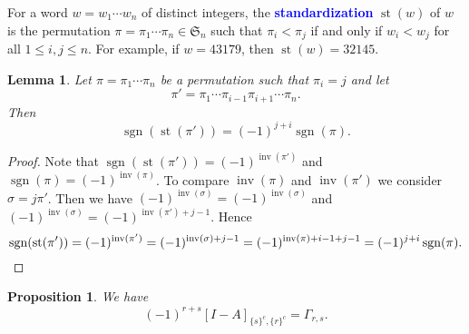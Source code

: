 \documentclass[oneside]{book}
\numberwithin{equation}{section}
\newtheorem{lem}[thm]{Lemma}
\newtheorem{prop}[thm]{Proposition}
\theoremstyle{definition}
\newcommand\st{\operatorname{st}}
\newcommand\inv{\operatorname{inv}}
\newcommand\sgn{\operatorname{sgn}}
\newcommand\sym{\mathfrak{S}}
\renewcommand\emph[1]{\textcolor{blue}{\bf #1}}
\begin{document}
For a word \( w = w_1 \cdots w_n \) of distinct integers, the
\emph{standardization} \( \st(w) \) of \( w \) is the permutation
\( \pi = \pi_1 \cdots \pi_n\in \sym_n \) such that \( \pi_i<\pi_j \)
if and only if \( w_i<w_j \) for all \( 1\le i,j\le n \).
For example, if \( w = 43179 \), then \( \st(w) = 32145 \).

\begin{lem}\label{lem:11}
  Let \( \pi = \pi_1 \cdots \pi_n \) be a permutation
  such that \( \pi_i = j \) and let
  \[
    \pi' = \pi_1 \cdots \pi_{i-1} \pi_{i+1} \cdots \pi_n.
  \]
  Then
  \[
    \sgn(\st(\pi')) = (-1)^{j+i} \sgn(\pi).
  \]
\end{lem}

\begin{proof}
  Note that \( \sgn(\st(\pi')) = (-1)^{\inv(\pi')} \) and
  \( \sgn(\pi) = (-1)^{\inv(\pi)} \). To compare \( \inv(\pi) \) and
  \( \inv(\pi') \) we consider \( \sigma = j \pi' \). Then we have
  \( (-1)^{\inv(\sigma)} = (-1)^{\inv(\sigma)} \) and
  \( (-1)^{\inv(\sigma)} = (-1)^{\inv(\pi')+j-1} \).
  Hence
  \[
   \sgn(\st(\pi')) = (-1)^{\inv(\pi')} 
   = (-1)^{\inv(\sigma)+j-1}
   = (-1)^{\inv(\pi)+i-1+j-1}
   = (-1)^{j+i} \sgn(\pi). \qedhere
  \]
\end{proof}


\begin{prop}\label{pro:5}
  We have
\[
  (-1)^{r+s} [I-A]_{\{s\}^c,\{r\}^c} = \Gamma_{r,s}.
\]
\end{prop}
\end{document}
